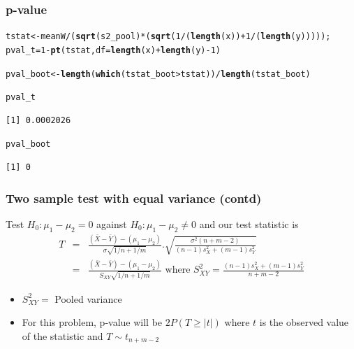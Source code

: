 \documentclass{beamer}\usepackage[]{graphicx}\usepackage[]{color}
\makeatletter
\newcommand{\hlnum}[1]{\textcolor[rgb]{0.2,0.2,0.2}{#1}}%
\newcommand{\hlopt}[1]{\textcolor[rgb]{0.102,0.102,0.102}{#1}}%
\newcommand{\hlstd}[1]{\textcolor[rgb]{0.102,0.102,0.102}{#1}}%
\newcommand{\hlkwb}[1]{\textcolor[rgb]{0.102,0.102,0.102}{#1}}%
\newcommand{\hlkwc}[1]{\textcolor[rgb]{0.2,0.2,0.2}{#1}}%
\newcommand{\hlkwd}[1]{\textcolor[rgb]{0.102,0.102,0.102}{\textbf{#1}}}%
\newenvironment{kframe}{%
 \def\at@end@of@kframe{}%
 \ifinner\ifhmode%
  \def\at@end@of@kframe{\end{minipage}}%
  \begin{minipage}{\columnwidth}%
 \fi\fi%
 \def\FrameCommand##1{\hskip\@totalleftmargin \hskip-\fboxsep
 \colorbox{shadecolor}{##1}\hskip-\fboxsep
     \hskip-\linewidth \hskip-\@totalleftmargin \hskip\columnwidth}%
 \MakeFramed {\advance\hsize-\width
   \@totalleftmargin\z@ \linewidth\hsize
   \@setminipage}}%
 {\par\unskip\endMakeFramed%
 \at@end@of@kframe}
\newenvironment{knitrout}{}{} %
\renewenvironment{knitrout}{\begin{spacing}{0.75}\begin{tiny}}{\end{tiny}\end{spacing}}
\makeatother
\begin{document}
\begin{frame}[fragile]
\frametitle{p-value}

\begin{knitrout}\small
{}\color{fgcolor}\begin{kframe}
\begin{alltt}
\hlstd{tstat} \hlkwb{<-} \hlstd{meanW}\hlopt{/} \hlstd{(}\hlkwd{sqrt}\hlstd{(s2_pool)}\hlopt{*}\hlstd{(}\hlkwd{sqrt}\hlstd{(}\hlnum{1}\hlopt{/}\hlstd{(}\hlkwd{length}\hlstd{(x))} \hlopt{+} \hlnum{1}\hlopt{/}\hlstd{(}\hlkwd{length}\hlstd{(y)))));}
\hlstd{pval_t} \hlkwb{=} \hlnum{1} \hlopt{-} \hlkwd{pt}\hlstd{(tstat,}\hlkwc{df}\hlstd{=}\hlkwd{length}\hlstd{(x)}\hlopt{+}\hlkwd{length}\hlstd{(y)}\hlopt{-}\hlnum{1}\hlstd{)}

\hlstd{pval_boot} \hlkwb{<-} \hlkwd{length}\hlstd{(}\hlkwd{which}\hlstd{(tstat_boot} \hlopt{>} \hlstd{tstat))}\hlopt{/}\hlkwd{length}\hlstd{(tstat_boot)}

\hlstd{pval_t}
\end{alltt}
\begin{verbatim}
[1] 0.0002026
\end{verbatim}
\begin{alltt}
\hlstd{pval_boot}
\end{alltt}
\begin{verbatim}
[1] 0
\end{verbatim}
\end{kframe}
\end{knitrout}

\end{frame}


\begin{frame}

\frametitle{Two sample test with equal variance (contd)}

Test $H_0:\mu_1-\mu_2=0$ against $H_0: \mu_1-\mu_2\ne 0$ and our test statistic is
\begin{eqnarray*}
T &=& \frac{(\bar X-\bar Y)-(\mu_1-\mu_2)}{\sigma\sqrt{1/n+1/m}} . \sqrt{\frac{\sigma^2(n+m-2)}{(n-1)s_X^2+(m-1)s_Y^2}} \\
&=& \frac{(\bar X-\bar Y)-(\mu_1-\mu_2)}{S_{XY}\sqrt{1/n+1/m}} \text{ where } S_{XY}^2=\frac{(n-1)s_X^2+(m-1)s_Y^2}{n+m-2}
\end{eqnarray*} \pause
\begin{itemize}
\item $S_{XY}^2=$ Pooled variance
\item For this problem, p-value will be $2P(T\ge |t|)$ where $t$ is the observed value of the statistic and $T\sim t_{n+m-2}$
\end{itemize}

\end{frame}
\end{document}
